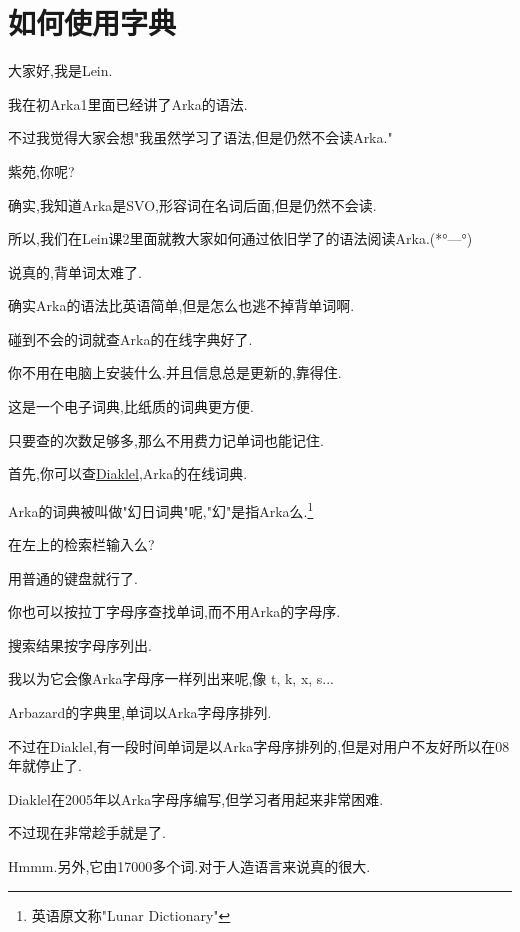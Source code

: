 \chapter{如何使用字典}
    

大家好,我是Lein.

我在初Arka1里面已经讲了Arka的语法.

不过我觉得大家会想"我虽然学习了语法,但是仍然不会读Arka."

紫苑,你呢?


确实,我知道Arka是SVO,形容词在名词后面,但是仍然不会读.

所以,我们在Lein课2里面就教大家如何通过依旧学了的语法阅读Arka.(*°---°)


说真的,背单词太难了.

确实Arka的语法比英语简单,但是怎么也逃不掉背单词啊.


碰到不会的词就查Arka的在线字典好了.

你不用在电脑上安装什么.并且信息总是更新的,靠得住. 


这是一个电子词典,比纸质的词典更方便.

只要查的次数足够多,那么不用费力记单词也能记住.

首先,你可以查\href{http://conlinguistics.org/klel/}{Diaklel},Arka的在线词典.

Arka的词典被叫做"幻日词典"呢,"幻"是指Arka么.\footnote{英语原文称"Lunar Dictionary"}

在左上的检索栏输入么?


用普通的键盘就行了.

你也可以按拉丁字母序查找单词,而不用Arka的字母序.



搜索结果按字母序列出.

我以为它会像Arka字母序一样列出来呢,像 t, k, x, s...



Arbazard的字典里,单词以Arka字母序排列.

不过在Diaklel,有一段时间单词是以Arka字母序排列的,但是对用户不友好所以在08年就停止了.



Diaklel在2005年以Arka字母序编写,但学习者用起来非常困难.

不过现在非常趁手就是了.


Hmmm.另外,它由17000多个词.对于人造语言来说真的很大.

